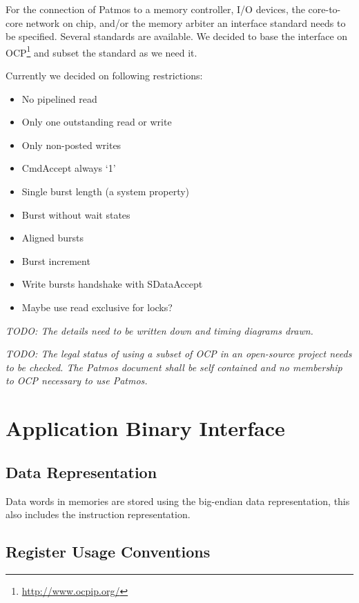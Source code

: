 \documentclass{IEEEtran}
\newcommand{\todo}[1]{{\emph{TODO: #1}}}
\begin{document}
For the connection of Patmos to a memory controller, I/O devices,
the core-to-core network on chip, and/or the memory arbiter an interface
standard needs to be specified. Several standards are available.
We decided to base the interface on OCP\footnote{\url{http://www.ocpip.org/}}
and subset the standard as we need it.

Currently we decided on following restrictions:

\begin{itemize}
\item No pipelined read
\item Only one outstanding read or write
\item Only non-posted writes
\item CmdAccept always `1'
\item Single burst length (a system property)
\item Burst without wait states
\item Aligned bursts
\item Burst increment
\item Write bursts handshake with SDataAccept
\item Maybe use read exclusive for locks?
\end{itemize}

\todo{The details need to be written down and timing diagrams drawn.}

\todo{The legal status of using a subset of OCP in an open-source
project needs to be checked. The Patmos document shall be
self contained and no membership to OCP necessary to use
Patmos.}

\section{Application Binary Interface}
\label{sec:abi}

\subsection{Data Representation}

Data words in memories are stored using the big-endian data representation, this
also includes the instruction representation.

\subsection{Register Usage Conventions}
\end{document}
